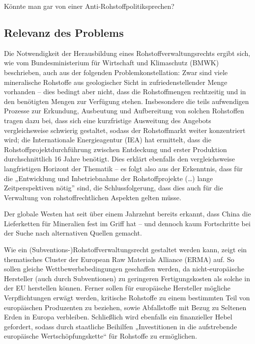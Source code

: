 \documentclass[12pt,a4paper,oneside]{book} %
\begin{document}
	Könnte man gar von einer \glqq Anti-Rohstoffpolitik\grqq sprechen?
	
	\subsection{Relevanz des Problems}
	Die Notwendigkeit der Herausbildung eines Rohstoffverwaltungsrechts ergibt sich, wie vom Bundesministerium für Wirtschaft und Klimaschutz (BMWK) beschrieben,\autocite{bundesministerium_fur_wirtschaft_und_klimaschutz_bmwk_industriepolitik_2023} auch aus der folgenden Problemkonstellation: Zwar sind viele mineralische Rohstoffe aus geologischer Sicht in zufriedenstellender Menge vorhanden – dies bedingt aber nicht, dass die Rohstoffmengen rechtzeitig und in den benötigten Mengen zur Verfügung stehen. Insbesondere die teils aufwendigen Prozesse zur Erkundung, Ausbeutung und Aufbereitung von solchen Rohstoffen tragen dazu bei, dass sich eine kurzfristige Ausweitung des Angebots vergleichsweise schwierig gestaltet, sodass der Rohstoffmarkt weiter konzentriert wird; die Internationale Energieagentur (IEA) hat ermittelt, dass die Rohstoffprojektdurchführung zwischen Entdeckung und erster Produktion durchschnittlich 16 Jahre benötigt.\autocite[12]{international_energy_agency_role_2021} Dies erklärt ebenfalls den vergleichsweise langfristigen Horizont der Thematik – es folgt also aus der Erkenntnis, dass für die „Entwicklung und Inbetriebnahme der Rohstoffprojekte (…) lange Zeitperspektiven nötig” sind,\autocite[13]{bundesministerium_fur_wirtschaft_und_klimaschutz_bmwk_industriepolitik_2023} die Schlussfolgerung, dass dies auch für die Verwaltung von rohstoffrechtlichen Aspekten gelten müsse.
	
	Der globale Westen hat seit über einem Jahrzehnt bereits erkannt, dass China die Lieferketten für Mineralien fest im Griff hat -- und dennoch kaum Fortschritte bei der Suche nach alternativen Quellen gemacht.
	
	Wie ein (Subventions-)Rohstoffverwaltungsrecht gestaltet werden kann, zeigt ein thematisches Cluster der European Raw Materials Alliance (ERMA) auf. So sollen gleiche Wettbewerbsbedingungen geschaffen werden, da nicht-europäische Hersteller (auch durch Subventionen) zu geringeren Fertigungskosten als solche in der EU herstellen können. Ferner sollen für europäische Hersteller mögliche Verpflichtungen erwägt werden, kritische Rohstoffe zu einem bestimmten Teil von europäischen Produzenten zu beziehen, sowie Abfallstoffe mit Bezug zu Seltenen Erden in Europa verbleiben. Schließlich wird ebenfalls ein finanzieller Hebel gefordert, sodass durch staatliche Beihilfen „Investitionen in die aufstrebende europäische Wertschöpfungskette“ für Rohstoffe zu ermöglichen.\autocite[7]{gaus_rare_2021}
	
\end{document}
